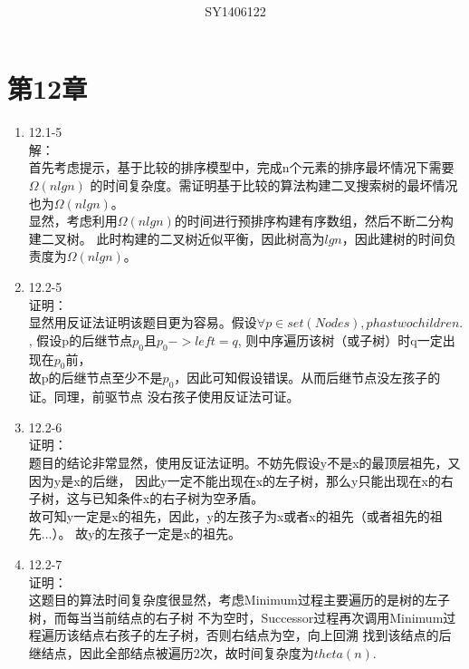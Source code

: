 \documentclass[UTF8]{ctexart}
\begin{document}
\title{\\}
\vspace{2cm}
\author{\\SY1406122}
\date{}
\maketitle

\section*{第12章}
\begin{enumerate}
    \item 12.1-5 \\
    解：\\
        首先考虑提示，基于比较的排序模型中，完成n个元素的排序最坏情况下需要$\Omega(nlgn)$
		的时间复杂度。需证明基于比较的算法构建二叉搜索树的最坏情况也为$\Omega(nlgn)$。\\
		显然，考虑利用$\Omega(nlgn)$的时间进行预排序构建有序数组，然后不断二分构建二叉树。
		此时构建的二叉树近似平衡，因此树高为$lgn$，因此建树的时间负责度为$\Omega(nlgn)$。\\
	
	\item 12.2-5 \\
	证明：\\
		显然用反证法证明该题目更为容易。假设$\forall p \in set(Nodes), p has two children.$,
		假设p的后继节点$p_0$且$p_0->left = q$, 则中序遍历该树（或子树）时q一定出现在$p_0$前，\\
		故p的后继节点至少不是$p_0$，因此可知假设错误。从而后继节点没左孩子的证。同理，前驱节点
		没右孩子使用反证法可证。
    
	\item 12.2-6 \\
	证明：\\
		题目的结论非常显然，使用反证法证明。不妨先假设y不是x的最顶层祖先，又因为y是x的后继，
		因此y一定不能出现在x的左子树，那么y只能出现在x的右子树，这与已知条件x的右子树为空矛盾。\\
		故可知y一定是x的祖先，因此，y的左孩子为x或者x的祖先（或者祖先的祖先...）。
		故y的左孩子一定是x的祖先。
		
	\item 12.2-7 \\
	证明：\\
		这题目的算法时间复杂度很显然，考虑Minimum过程主要遍历的是树的左子树，而每当当前结点的右子树
		不为空时，Successor过程再次调用Minimum过程遍历该结点右孩子的左子树，否则右结点为空，向上回溯
		找到该结点的后继结点，因此全部结点被遍历2次，故时间复杂度为$theta(n)$.
		

\end{enumerate}
\end{document}
